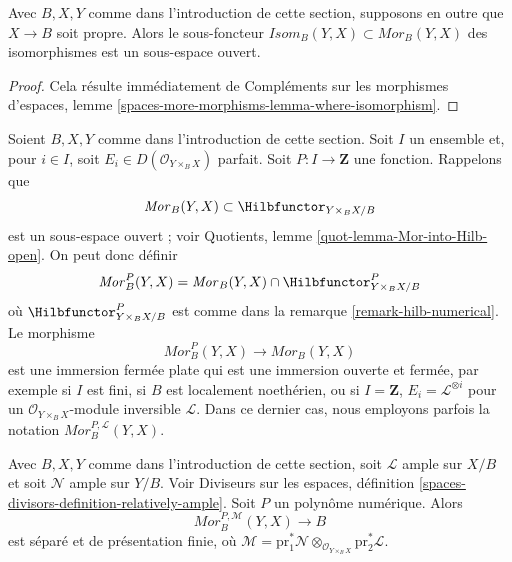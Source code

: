 \begin{lemma}
\label{lemma-Isom-in-Mor}
Avec $B, X, Y$ comme dans l'introduction de cette section, supposons en
outre que $X \to B$ soit propre. Alors le sous-foncteur
$\mathit{Isom}_B(Y, X) \subset \mathit{Mor}_B(Y, X)$ des isomorphismes est
un sous-espace ouvert.
\end{lemma}

\begin{proof}
Cela résulte immédiatement de Compléments sur les morphismes d'espaces,
lemme \ref{spaces-more-morphisms-lemma-where-isomorphism}.
\end{proof}

\begin{remark}
\label{remark-Mor-numerical}
Soient $B, X, Y$ comme dans l'introduction de cette section.
Soit $I$ un ensemble et, pour $i \in I$, soit
$E_i \in D(\mathcal{O}_{Y \times_B X})$ parfait.
Soit $P : I \to \mathbf{Z}$ une fonction. Rappelons que
$$
\mathit{Mor}_B(Y, X) \subset
\Hilbfunctor_{Y \times_B X/B}
$$
est un sous-espace ouvert ; voir Quotients, lemme
\ref{quot-lemma-Mor-into-Hilb-open}. On peut donc définir
$$
\mathit{Mor}^P_B(Y, X) =
\mathit{Mor}_B(Y, X) \cap \Hilbfunctor^P_{Y \times_B X/B}
$$
où $\Hilbfunctor^P_{Y \times_B X/B}$ est comme dans la remarque
\ref{remark-hilb-numerical}. Le morphisme
$$
\mathit{Mor}^P_B(Y, X) \longrightarrow \mathit{Mor}_B(Y, X)
$$
est une immersion fermée plate qui est une immersion ouverte et fermée,
par exemple si $I$ est fini, si $B$ est localement noethérien, ou si
$I = \mathbf{Z}$, $E_i = \mathcal{L}^{\otimes i}$ pour un
$\mathcal{O}_{Y \times_B X}$-module inversible $\mathcal{L}$.
Dans ce dernier cas, nous employons parfois la notation
$\mathit{Mor}^{P, \mathcal{L}}_B(Y, X)$.
\end{remark}

\begin{lemma}
\label{lemma-Mor-qc-over-base}
Avec $B, X, Y$ comme dans l'introduction de cette section, soit
$\mathcal{L}$ ample sur $X/B$ et soit $\mathcal{N}$ ample sur $Y/B$.
Voir Diviseurs sur les espaces, définition
\ref{spaces-divisors-definition-relatively-ample}.
Soit $P$ un polynôme numérique. Alors
$$
\mathit{Mor}^{P, \mathcal{M}}_B(Y, X) \longrightarrow B
$$
est séparé et de présentation finie, où
$\mathcal{M} = \text{pr}_1^*\mathcal{N}
\otimes_{\mathcal{O}_{Y \times_B X}} \text{pr}_2^*\mathcal{L}$.
\end{lemma}

